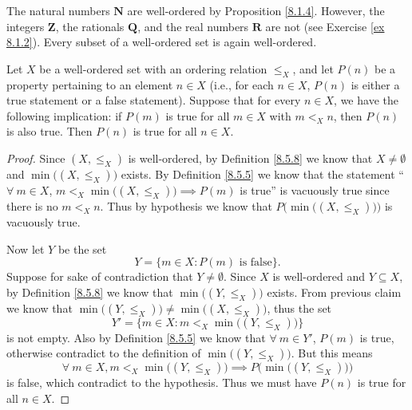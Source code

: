 \begin{example}\label{8.5.9}
    The natural numbers \(\mathbf{N}\) are well-ordered by Proposition \ref{8.1.4}.
    However, the integers \(\mathbf{Z}\), the rationals \(\mathbf{Q}\), and the real numbers \(\mathbf{R}\) are not (see Exercise \ref{ex 8.1.2}).
    Every subset of a well-ordered set is again well-ordered.
\end{example}

\begin{proposition}\label{8.5.10}
    Let \(X\) be a well-ordered set with an ordering relation \(\leq_X\), and let \(P(n)\) be a property pertaining to an element \(n \in X\)
    (i.e., for each \(n \in X\), \(P(n)\) is either a true statement or a false statement).
    Suppose that for every \(n \in X\), we have the following implication:
    if \(P(m)\) is true for all \(m \in X\) with \(m <_X n\), then \(P(n)\) is also true.
    Then \(P(n)\) is true for all \(n \in X\).
\end{proposition}

\begin{proof}
    Since \((X, \leq_X)\) is well-ordered, by Definition \ref{8.5.8} we know that \(X \neq \emptyset\) and \(\min\big((X, \leq_X)\big)\) exists.
    By Definition \ref{8.5.5} we know that the statement ``\(\forall\ m \in X\), \(m <_X \min\big((X, \leq_X)\big) \implies P(m)\) is true'' is vacuously true since there is no \(m <_X n\).
    Thus by hypothesis we know that \(P\Big(\min\big((X, \leq_X)\big)\Big)\) is vacuously true.

    Now let \(Y\) be the set
    \[
        Y = \{m \in X : P(m) \text{ is false}\}.
    \]
    Suppose for sake of contradiction that \(Y \neq \emptyset\).
    Since \(X\) is well-ordered and \(Y \subseteq X\), by Definition \ref{8.5.8} we know that \(\min\big((Y, \leq_X)\big)\) exists.
    From previous claim we know that \(\min\big((Y, \leq_X)\big) \neq \min\big((X, \leq_X)\big)\), thus the set
    \[
        Y' = \{m \in X : m <_X \min\big((Y, \leq_X)\big)\}
    \]
    is not empty.
    Also by Definition \ref{8.5.5} we know that \(\forall\ m \in Y'\), \(P(m)\) is true, otherwise contradict to the definition of \(\min\big((Y, \leq_X)\big)\).
    But this means
    \[
        \forall\ m \in X, m <_X \min\big((Y, \leq_X)\big) \implies P\Big(\min\big((Y, \leq_X)\big)\Big)
    \]
    is false, which contradict to the hypothesis.
    Thus we must have \(P(n)\) is true for all \(n \in X\).
\end{proof}

